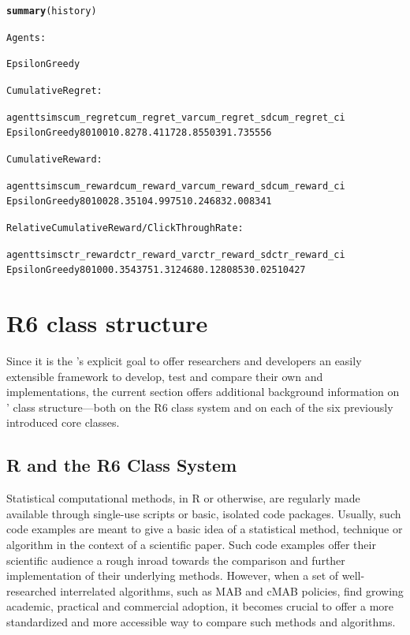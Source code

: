 \documentclass{jss}\usepackage[]{graphicx}\usepackage[]{color}
\makeatletter
\newcommand{\hlkwd}[1]{\textcolor[rgb]{0.737,0.353,0.396}{\textbf{#1}}}%
\newenvironment{kframe}{%
 \def\at@end@of@kframe{}%
 \ifinner\ifhmode%
  \def\at@end@of@kframe{\end{minipage}}%
  \begin{minipage}{\columnwidth}%
 \fi\fi%
 \def\FrameCommand##1{\hskip\@totalleftmargin \hskip-\fboxsep
 \colorbox{shadecolor}{##1}\hskip-\fboxsep
     \hskip-\linewidth \hskip-\@totalleftmargin \hskip\columnwidth}%
 \MakeFramed {\advance\hsize-\width
   \@totalleftmargin\z@ \linewidth\hsize
   \@setminipage}}%
 {\par\unskip\endMakeFramed%
 \at@end@of@kframe}
\newenvironment{knitrout}{}{} %
\makeatother
\begin{document}
\begin{knitrout}\small
{}\color{fgcolor}\begin{kframe}
\begin{alltt}
\hlkwd{summary}(history)

Agents:

  EpsilonGreedy

Cumulative Regret:

         agent  t sims cum_regret cum_regret_var cum_regret_sd cum_regret_ci
 EpsilonGreedy 80  100      10.82       78.41172      8.855039      1.735556


Cumulative Reward:

         agent  t sims cum_reward cum_reward_var cum_reward_sd cum_reward_ci
 EpsilonGreedy 80  100      28.35       104.9975      10.24683      2.008341


Relative Cumulative Reward / Click Through Rate:

         agent  t sims ctr_reward ctr_reward_var ctr_reward_sd ctr_reward_ci
 EpsilonGreedy 80  100   0.354375       1.312468     0.1280853    0.02510427
\end{alltt}
\end{kframe}
\end{knitrout}

\section{R6 class structure}

Since it is the 's explicit goal to offer researchers and developers an easily extensible framework to develop, test and compare their own  and  implementations, the current section offers additional background information on ' class structure---both on the R6 class system and on each of the six previously introduced core  classes.

\subsection{R and the R6 Class System}

Statistical computational methods, in R or otherwise, are regularly made available through single-use scripts or basic, isolated code packages. Usually, such code examples are meant to give a basic idea of a statistical method, technique or algorithm in the context of a scientific paper.  Such code examples offer their scientific audience a rough inroad towards the comparison and further implementation of their underlying methods. However, when a set of well-researched interrelated algorithms, such as MAB and cMAB policies, find growing academic, practical and commercial adoption, it becomes crucial to offer a more standardized and more accessible way to compare such methods and algorithms.
\end{document}
